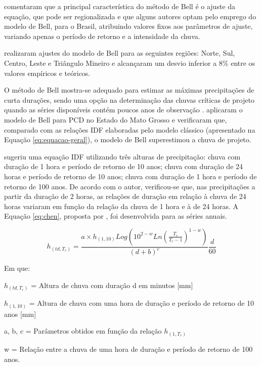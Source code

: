  comentaram que a principal característica do método de Bell é o ajuste da equação, que pode ser regionalizada e que alguns autores optam pelo emprego do modelo de Bell, para o Brasil, atribuindo valores fixos aos parâmetros de ajuste, variando apenas o período de retorno e a intensidade da chuva.
    
 realizaram ajustes do modelo de Bell para as seguintes regiões: Norte, Sul, Centro, Leste e Triângulo Mineiro e alcançaram um desvio inferior a 8\% entre os valores empíricos e teóricos.

O método de Bell mostra-se adequado para estimar as máximas precipitações de curta durações, sendo uma opção na determinação das chuvas críticas de projeto quando as séries disponíveis contém poucos anos de observação \cite{goias}.  aplicaram o modelo de Bell para PCD no Estado do Mato Grosso e verificaram que, comparado com as relações IDF elaboradas pelo modelo clássico (apresentado na Equação \ref{eq:equacao-geral}), o modelo de Bell superestimou a chuva de projeto.

 sugeriu uma equação IDF utilizando três alturas de precipitação: chuva com duração de 1 hora e período de retorno de 10 anos; chuva com duração de 24 horas e período de retorno de 10 anos; chuva com duração de 1 hora e período de retorno de 100 anos. De acordo com o autor, verificou-se que, nas precipitações a partir da duração de 2 horas, as relações de duração em relação à chuva de 24 horas variaram em função da relação da chuva de 1 hora e à de 24 horas. A Equação \ref{eq:chen}, proposta por , foi desenvolvida para as séries anuais.

\begin{equation}
\label{eq:chen}
    h_{(td,T_r)} = \frac{a \times h_{(1,10)} Log(10^{2-w}Ln(\frac{T_r}{T_r-1})^{1-w})}{(d+b)^c} \frac{d}{60}
\end{equation}

Em que:

$h_{(td, T_r)}$ = Altura de chuva com duração d em minutos [mm]

$h_{(1,10)}$ = Altura de chuva com uma hora de duração e período de retorno de 10 anos [mm]

a, b, c = Parâmetros obtidos em função da relação $h_{(1, T_r)}$

w = Relação entre a chuva de uma hora de duração e período de retorno de 100 anos.

